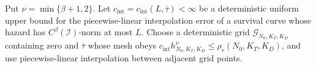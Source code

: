 Put \(\nu=\min\{\beta+1,2\}\).  Let \(c_{\mathrm{int}}=c_{\mathrm{int}}(L,\bar\tau)<\infty\) be a deterministic uniform upper bound for the piecewise-linear interpolation error of a survival curve whose hazard has \(C^\beta(\mathcal I)\)-norm at most \(L\).  Choose a deterministic grid \(\mathcal G_{N_0,K_T,K_D}\) containing zero and \(\bar\tau\) whose mesh obeys \(c_{\mathrm{int}}h_{N_0,K_T,K_D}^{\nu}\le\rho_r(N_0,K_T,K_D)\), and use piecewise-linear interpolation between adjacent grid points.